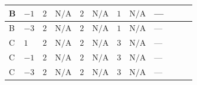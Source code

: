 \documentclass[8pt]{article}
\begin{document}
\begin{landscape}
\begin{longtable}{@{}llcccccc >{\raggedright\arraybackslash}p{0.21\linewidth} >{\raggedright\arraybackslash}p{0.21\linewidth} >{\raggedright\arraybackslash}p{0.21\linewidth}@{}}
\midrule
B & $-1$ & $2$ & $\text{N/A}$ & $2$ & $\text{N/A}$ & $1$ & $\text{N/A}$ & --- & \scriptsize\adjustbox{max width=\linewidth}{$\begin{gathered} +\frac{9 {g_2}^4}{4}\end{gathered}$} & \scriptsize\adjustbox{max width=\linewidth}{$\begin{gathered} +{g_1}^2 \left(\frac{3 {g_2}^2}{2}-3 {\lambda_{S_1}^{(1)}}\right)\end{gathered}$} \\
\midrule
B & $-3$ & $2$ & $\text{N/A}$ & $2$ & $\text{N/A}$ & $1$ & $\text{N/A}$ & --- & \scriptsize\adjustbox{max width=\linewidth}{$\begin{gathered} \frac{9 {g_2}^4}{4}\end{gathered}$} & \scriptsize\adjustbox{max width=\linewidth}{$\begin{gathered} +{g_1}^2 \left(\frac{27 {g_2}^2}{2}-27 {\lambda_{S_1}^{(1)}}\right)\end{gathered}$} \\
\midrule
C & $1$ & $2$ & $\text{N/A}$ & $2$ & $\text{N/A}$ & $3$ & $\text{N/A}$ & --- & \scriptsize\adjustbox{max width=\linewidth}{$\begin{gathered} +\frac{9 {g_2}^4}{4}\end{gathered}$} & \scriptsize\adjustbox{max width=\linewidth}{$\begin{gathered} +{g_1}^2 \left(\frac{3 {g_2}^2}{2}-3 {\lambda_{S_1}^{(1)}}\right)\end{gathered}$} \\
\midrule
C & $-1$ & $2$ & $\text{N/A}$ & $2$ & $\text{N/A}$ & $3$ & $\text{N/A}$ & --- & \scriptsize\adjustbox{max width=\linewidth}{$\begin{gathered} +\frac{9 {g_2}^4}{4}\end{gathered}$} & \scriptsize\adjustbox{max width=\linewidth}{$\begin{gathered} +{g_1}^2 \left(\frac{3 {g_2}^2}{2}-3 {\lambda_{S_1}^{(1)}}\right)\end{gathered}$} \\
\midrule
C & $-3$ & $2$ & $\text{N/A}$ & $2$ & $\text{N/A}$ & $3$ & $\text{N/A}$ & --- & \scriptsize\adjustbox{max width=\linewidth}{$\begin{gathered} \frac{9 {g_2}^4}{4}\end{gathered}$} & \scriptsize\adjustbox{max width=\linewidth}{$\begin{gathered} +{g_1}^2 \left(\frac{27 {g_2}^2}{2}-27 {\lambda_{S_1}^{(1)}}\right)\end{gathered}$} \\

\end{longtable}
\end{landscape}
\end{document}
